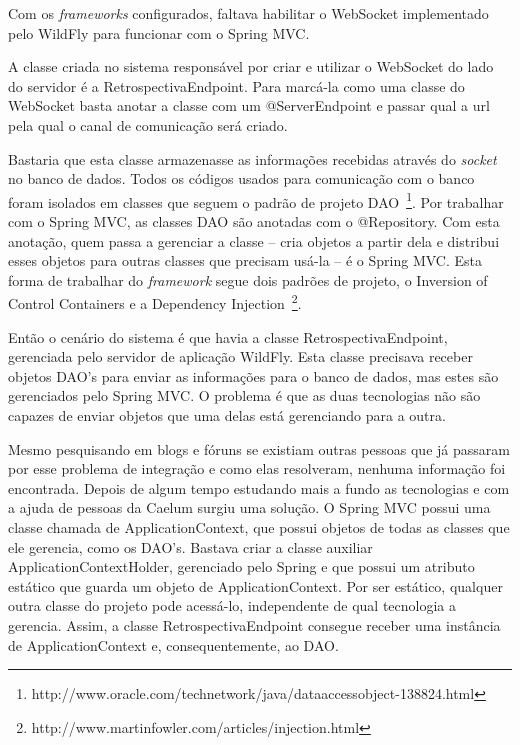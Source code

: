 Com os \textit{frameworks} configurados, faltava habilitar o WebSocket implementado pelo WildFly para funcionar com o Spring MVC.

A classe criada no sistema responsável por criar e utilizar o WebSocket do lado do servidor é a RetrospectivaEndpoint. Para marcá-la como uma classe do WebSocket basta anotar a classe com um @ServerEndpoint e passar qual a url pela qual o canal de comunicação será criado.

Bastaria que esta classe armazenasse as informações recebidas através do \textit{socket} no banco de dados. Todos os códigos usados para comunicação com o banco foram isolados em classes que seguem o padrão de projeto DAO~\footnote{http://www.oracle.com/technetwork/java/dataaccessobject-138824.html}. Por trabalhar com o Spring MVC, as classes DAO são anotadas com o @Repository. Com esta anotação, quem passa a gerenciar a classe -- cria objetos a partir dela e distribui esses objetos para outras classes que precisam usá-la -- é o Spring MVC. Esta forma de trabalhar do \textit{framework} segue dois padrões de projeto, o Inversion of Control Containers e a Dependency Injection~\footnote{http://www.martinfowler.com/articles/injection.html}.

Então o cenário do sistema é que havia a classe RetrospectivaEndpoint, gerenciada pelo servidor de aplicação WildFly. Esta classe precisava receber objetos DAO's para enviar as informações para o banco de dados, mas estes são gerenciados pelo Spring MVC. O problema é que as duas tecnologias não são capazes de enviar objetos que uma delas está gerenciando para a outra.

Mesmo pesquisando em blogs e fóruns se existiam outras pessoas que já passaram por esse problema de integração e como elas resolveram, nenhuma informação foi encontrada. Depois de algum tempo estudando mais a fundo as tecnologias e com a ajuda de pessoas da Caelum surgiu uma solução. O Spring MVC possui uma classe chamada de ApplicationContext, que possui objetos de todas as classes que ele gerencia, como os DAO's. Bastava criar a classe auxiliar ApplicationContextHolder, gerenciado pelo Spring e que possui um atributo estático que guarda um objeto de ApplicationContext. Por ser estático, qualquer outra classe do projeto pode acessá-lo, independente de qual tecnologia a gerencia. Assim, a classe RetrospectivaEndpoint consegue receber uma instância de ApplicationContext e, consequentemente, ao DAO.

